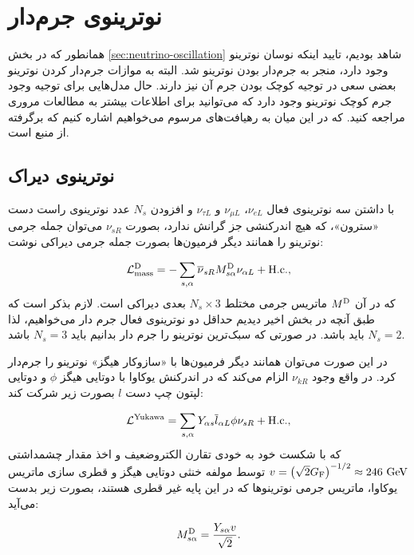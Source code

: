 \documentclass[a4paper]{book}
\begin{document}
\section{نوترینوی جرم‌دار}
\label{sec:massive-neutrino}
همانطور که در بخش \ref{sec:neutrino-oscillation} شاهد بودیم، تایید اینکه نوسان نوترینو وجود دارد، منجر به جرم‌دار بودن نوترینو شد. البته به موازات جرم‌دار کردن نوترینو بعضی سعی در توجیه کوچک بودن جرم آن نیز دارند. حال مدل‌هایی برای توجیه وجود جرم کوچک نوترینو وجود دارد که می‌توانید برای اطلاعات بیشتر به مطالعات مروری \cite{deGouvea:2016qpx,Cai:2017jrq,King:2003jb} مراجعه کنید. که در این میان به رهیافت‌های مرسوم می‌خواهیم اشاره کنیم که برگرفته از منبع \cite{Giunti:2007ry} است.

\subsection{نوترینوی دیراک}
با داشتن سه نوترینوی فعال {\footnotesize$\nu_{eL}$}، {\footnotesize$\nu_{\mu L}$} و {\footnotesize$\nu_{\tau L}$} و افزودن {\footnotesize$N_s$} عدد نوترینوی راست دست «سترون»، که هیچ اندرکنشی جز گرانش ندارد، بصورت {\footnotesize$\nu_{sR}$} می‌توان جمله جرمی نوترینو را همانند دیگر فرمیون‌ها بصورت جمله جرمی دیراکی نوشت:
\par
\vspace{-0.5cm}
{\footnotesize\begin{align}
		\mathcal{L}^{\rm D}_{\rm mass}=-\sum_{s,\alpha}\overline{\nu}_{sR} M_{s\alpha}^{\rm D} \nu_{\alpha L} + {\rm H.c.},
		\label{eq:dirac-neutrino}
\end{align}}
که در آن {\footnotesize$M^{\rm D}$} ماتریس جرمی مختلط {\footnotesize$N_s\times3$}  بعدی دیراکی است. لازم بذکر است که طبق آنچه در بخش اخیر دیدیم حداقل دو نوترینوی فعال جرم دار می‌خواهیم، لذا {\footnotesize$N_s=2$} باید باشد. در صورتی که سبک‌ترین نوترینو را جرم دار بدانیم باید {\footnotesize$N_s=3$} باشد.

در این صورت می‌توان همانند دیگر فرمیون‌ها با «سازوکار هیگز» نوترینو را جرم‌دار کرد. در واقع وجود {\footnotesize$\nu_{kR}$} الزام می‌کند که در اندرکنش یوکاوا با دوتایی هیگز {\footnotesize$\phi$} و دوتایی لپتون چپ دست {\footnotesize$l$} بصورت زیر شرکت کند:
\par
\vspace{-0.5cm}
{\footnotesize\begin{align}
	\mathcal{L}^{\rm Yukawa} = \sum_{s,\alpha} Y_{\alpha s} \overline{l}_{\alpha L} \phi \nu_{sR} + {\rm H.c.},
	\label{eq:yukawa}
\end{align}}
که با شکست خود به خودی تقارن الکتروضعیف و اخذ مقدار چشمداشتی  {\footnotesize$v=\left(\sqrt{2}G_{\rm F}\right)^{-1/2} \approx 246\ {\rm GeV}$} توسط مولفه خنثی دوتایی هیگز و قطری سازی ماتریس یوکاوا، ماتریس جرمی نوترینوها که در این پایه غیر قطری هستند، بصورت زیر بدست می‌آید:
\par
\vspace{-0.5cm}
{\footnotesize\begin{align}
	M^{\rm D}_{s \alpha}=\frac{Y_{s \alpha} v}{\sqrt{2}}.
\end{align}}
\end{document}

